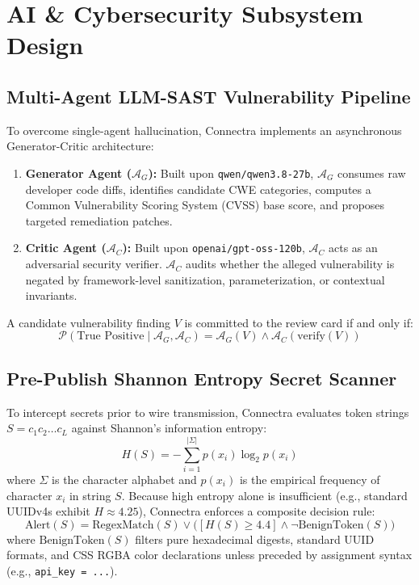 \documentclass[journal,10pt,twocolumn]{IEEEtran}
\begin{document}
\section{AI \& Cybersecurity Subsystem Design}

\subsection{Multi-Agent LLM-SAST Vulnerability Pipeline}
To overcome single-agent hallucination, Connectra implements an asynchronous Generator-Critic architecture:
\begin{enumerate}
    \item \textbf{Generator Agent ($\mathcal{A}_G$):} Built upon \texttt{qwen/qwen3.8-27b}, $\mathcal{A}_G$ consumes raw developer code diffs, identifies candidate CWE categories, computes a Common Vulnerability Scoring System (CVSS) base score, and proposes targeted remediation patches.
    \item \textbf{Critic Agent ($\mathcal{A}_C$):} Built upon \texttt{openai/gpt-oss-120b}, $\mathcal{A}_C$ acts as an adversarial security verifier. $\mathcal{A}_C$ audits whether the alleged vulnerability is negated by framework-level sanitization, parameterization, or contextual invariants.
\end{enumerate}
A candidate vulnerability finding $V$ is committed to the review card if and only if:
\begin{equation}
\mathcal{P}(\text{True Positive} \mid \mathcal{A}_G, \mathcal{A}_C) = \mathcal{A}_G(V) \land \mathcal{A}_C(\text{verify}(V))
\end{equation}

\subsection{Pre-Publish Shannon Entropy Secret Scanner}
To intercept secrets prior to wire transmission, Connectra evaluates token strings $S = c_1 c_2 \dots c_L$ against Shannon's information entropy:
\begin{equation}
H(S) = - \sum_{i=1}^{|\Sigma|} p(x_i) \log_2 p(x_i)
\end{equation}
where $\Sigma$ is the character alphabet and $p(x_i)$ is the empirical frequency of character $x_i$ in string $S$. 
Because high entropy alone is insufficient (e.g., standard UUIDv4s exhibit $H \approx 4.25$), Connectra enforces a composite decision rule:
\begin{equation}
\text{Alert}(S) = \text{RegexMatch}(S) \lor \Big( [H(S) \ge 4.4] \land \neg \text{BenignToken}(S) \Big)
\end{equation}
where $\text{BenignToken}(S)$ filters pure hexadecimal digests, standard UUID formats, and CSS RGBA color declarations unless preceded by assignment syntax (e.g., \texttt{api\_key = ...}).
\end{document}

